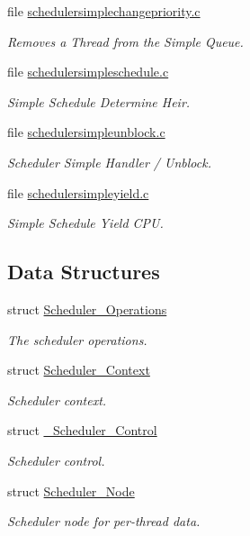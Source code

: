 \begin{DoxyCompactItemize}
file \mbox{\hyperlink{schedulersimplechangepriority_8c}{schedulersimplechangepriority.\+c}}
\begin{DoxyCompactList}\small\item\em Removes a Thread from the Simple Queue. \end{DoxyCompactList}\item 
file \mbox{\hyperlink{schedulersimpleschedule_8c}{schedulersimpleschedule.\+c}}
\begin{DoxyCompactList}\small\item\em Simple Schedule Determine Heir. \end{DoxyCompactList}\item 
file \mbox{\hyperlink{schedulersimpleunblock_8c}{schedulersimpleunblock.\+c}}
\begin{DoxyCompactList}\small\item\em Scheduler Simple Handler / Unblock. \end{DoxyCompactList}\item 
file \mbox{\hyperlink{schedulersimpleyield_8c}{schedulersimpleyield.\+c}}
\begin{DoxyCompactList}\small\item\em Simple Schedule Yield C\+PU. \end{DoxyCompactList}\end{DoxyCompactItemize}
\subsection*{Data Structures}
\begin{DoxyCompactItemize}
\item 
struct \mbox{\hyperlink{structScheduler__Operations}{Scheduler\+\_\+\+Operations}}
\begin{DoxyCompactList}\small\item\em The scheduler operations. \end{DoxyCompactList}\item 
struct \mbox{\hyperlink{structScheduler__Context}{Scheduler\+\_\+\+Context}}
\begin{DoxyCompactList}\small\item\em Scheduler context. \end{DoxyCompactList}\item 
struct \mbox{\hyperlink{struct__Scheduler__Control}{\+\_\+\+Scheduler\+\_\+\+Control}}
\begin{DoxyCompactList}\small\item\em Scheduler control. \end{DoxyCompactList}\item 
struct \mbox{\hyperlink{structScheduler__Node}{Scheduler\+\_\+\+Node}}
\begin{DoxyCompactList}\small\item\em Scheduler node for per-\/thread data. \end{DoxyCompactList}\end{DoxyCompactItemize}
